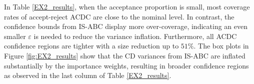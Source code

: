 In Table \ref{EX2_results}, when the acceptance proportion is small, most coverage rates of %
accept-reject ACDC are close to the nominal level. In contrast, the  confidence bounds from IS-ABC 
display more over-coverage, indicating an even  smaller $\varepsilon$ is needed to reduce the variance inflation. Furthermore, all ACDC confidence regions %
are tighter with a size reduction up to $51\%$. The box plots in Figure \ref{fig:EX2_results} show that the CD variances from IS-ABC are inflated substantially by the importance weights, resulting in broader confidence regions as observed in the last column of Table \ref{EX2_results}.



